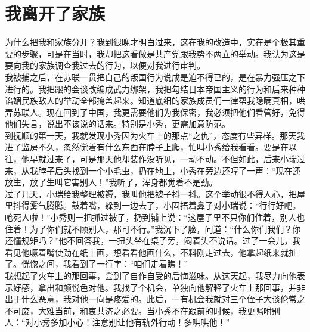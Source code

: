 \fancyhead[RO]{} %
\fancyhead[LE]{} %
\chapter*{我离开了家族}
\thispagestyle{empty}
为什么把我和家族分开？我到很晚才明白过来，这在我的改造中，实在是个极其重要的步骤，可是在当时，我却把这看做是共产党跟我势不两立的举动。我认为这是要向我的家族调查我过去的行为，以便对我进行审判。\\

我被捕之后，在苏联一贯把自己的叛国行为说成是迫不得已的，是在暴力强压之下进行的。我把跟的会谈改编成武力绑架，我把勾结日本帝国主义的行为和后来种种谄媚民族敌人的举动全部掩盖起来。知道底细的家族成员们一律帮我隐瞒真相，哄弄苏联人。现在回到了中国，我更需要他们为我保密，我必须把他们看管好，免得他们失言，说出不该说的话来。特别是小秀，更需加意防范。\\

到抚顺的第一天，我就发现小秀因为火车上的那点“之仇”，态度有些异样。那天我进了监房不久，忽然觉着有什么东西在脖子上爬，忙叫小秀给我看看。要是在以往，他早就过来了，可是那天他却装作没听见，一动不动。不但如此，后来小瑞过来，从我脖子后头找到一个小毛虫，扔在地上，小秀在旁边还哼了一声：“现在还放生，放了生叫它害别人！”我听了，浑身都觉着不是劲。\\

过了几天，小瑞给我整理被褥，我叫他把被子抖一抖。这个举动很不得人心，把屋里抖得雾气腾腾。鼓着嘴，躲到一边去了，小固捂着鼻子对小瑞说：“行行好吧。呛死人啦！”小秀则一把抓过被子，扔到铺上说：“这屋子里不只你们住着，别人也住着！为了你们就不顾别人，那可不行。”我沉下了脸，问道：“什么你们我们？你还懂规矩吗？”他不回答我，一扭头坐在桌子旁，闷着头不说话。过了一会儿，我看见他噘着嘴使劲在纸上画，想看看他画什么，不料刚走过去，他拿起纸来就扯了。恍惚之间，我看到了一行字：“咱们走着瞧！”\\

我想起了火车上的那回事，尝到了自作自受的后悔滋味。从这天起，我尽力向他表示好感，拿出和颜悦色对他。我找了个机会，单独向他解释了火车上那回事，并非出于什么恶意，我对他一向是疼爱的。此后，一有机会我就对三个侄子大谈伦常之不可废，大难当前，和衷共济之必要。当小秀不在跟前的时候，我更嘱咐别人：“对小秀多加小心！注意别让他有轨外行动！多哄哄他！”\\

